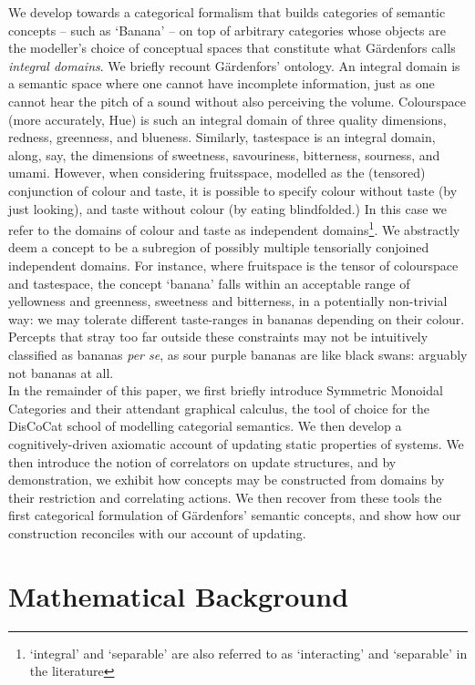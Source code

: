 \documentclass[11pt]{article}
\theoremstyle{definition}
\theoremstyle{plain}
\begin{document}
We develop towards a categorical formalism that builds categories of semantic concepts -- such as `Banana' -- on top of arbitrary categories whose objects are the modeller's choice of conceptual spaces that constitute what G\"{a}rdenfors calls \emph{integral domains}.  We briefly recount G\"{a}rdenfors' ontology. An integral domain is a semantic space where one cannot have incomplete information, just as one cannot hear the pitch of a sound without also perceiving the volume. Colourspace (more accurately, Hue) is such an integral domain of three quality dimensions, redness, greenness, and blueness. Similarly, tastespace is an integral domain, along, say, the dimensions of sweetness, savouriness, bitterness, sourness, and umami. However, when considering fruitsspace, modelled as the (tensored) conjunction of colour and taste, it is possible to specify colour without taste (by just looking), and taste without colour (by eating blindfolded.) In this case we refer to the domains of colour and taste as independent domains\footnote{`integral' and `separable' are also referred to as `interacting' and `separable' in the literature}. We abstractly deem a concept to be a subregion of possibly multiple tensorially conjoined independent domains. For instance, where fruitspace is the tensor of colourspace and tastespace, the concept `banana' falls within an acceptable range of yellowness and greenness, sweetness and bitterness, in a potentially non-trivial way: we may tolerate different taste-ranges in bananas depending on their colour. Percepts that stray too far outside these constraints may not be intuitively classified as bananas \emph{per se}, as sour purple bananas are like black swans: arguably not bananas at all.\\

In the remainder of this paper, we first briefly introduce Symmetric Monoidal Categories and their attendant graphical calculus, the tool of choice for the DisCoCat school of modelling categorial semantics. We then develop a cognitively-driven axiomatic account of updating static properties of systems. We then introduce the notion of correlators on update structures, and by demonstration, we exhibit how concepts may be constructed from domains by their restriction and correlating actions. We then recover from these tools the first categorical formulation of G\"{a}rdenfors' semantic concepts, and show how our construction reconciles with our account of updating.

\section{Mathematical Background}
\end{document}
